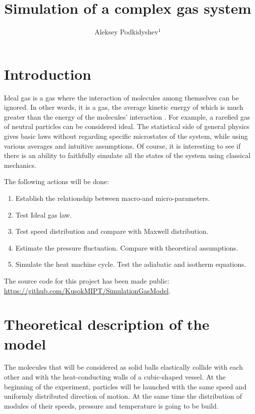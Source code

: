 \documentclass[12pt,twoside]{article}
\title
{Simulation of a complex gas system}
\author
{Aleksey Podkidyshev$^1$}
\begin{document}
    \maketitle

    \section{Introduction}
    Ideal gas is a gas where the interaction of molecules among themselves can be ignored. In other words, it is a gas,
    the average kinetic energy of which is much greater than the
    energy of the molecules' interaction \cite{kirichenko2003termodinamics}. For example, a rarefied gas of neutral particles can be considered ideal.
    The statistical side of general physics gives basic laws without regarding specific microstates of the system, while using various averages and
    intuitive assumptions. 
    Of course, it is interesting to see if there is an ability to faithfully simulate all the states of the system using classical mechanics.

    The following actions will be done:
    \begin{enumerate}
        \item Establish the relationship between macro-and micro-parameters.
        \item Test Ideal gas law. \cite{wiki:idealgas}
        \item Test speed distribution and compare with Maxwell distribution. \cite{kirichenko2003termodinamics}
        \item Estimate the pressure fluctuation. Compare with theoretical assumptions. \cite{sivuhin}
        \item Simulate the heat machine cycle. Test the adiabatic and isotherm equations. \cite{wiki:heatmachine}
    \end{enumerate}

    The source code for this project has been made public: \url{https://github.com/KusokMIPT/SimulationGasModel}.

    \section{Theoretical description of the model}

    \indent The molecules that will be considered as solid balls elastically collide with each other and with the heat-conducting walls of a cubic-shaped vessel.
    At the beginning of the experiment, particles will be launched with the same speed and uniformly distributed direction of motion.
    At the same time the distribution of modules of their speeds, pressure and temperature is going to be build.
\end{document}
